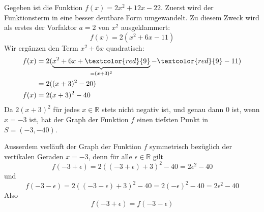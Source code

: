 \begin{examplebox}{}
    Gegeben ist die Funktion $f(x)=2x^2+12x-22$. Zuerst wird der Funktionsterm in eine \glqq besser deutbare\grqq{} Form umgewandelt. Zu diesem Zweck wird als erstes der Vorfaktor $a=2$ von $x^2$ ausgeklammert:
    \[
        f(x)=2(x^2+6x-11)
    \]
    Wir ergänzen den Term $x^2 + 6x$ quadratisch:
    \begin{align*}
        f(x) & = 2(\underbrace{x^2 +6x + \textcolor{red}{9}}_{=(x+3)^2} - \textcolor{red}{9} - 11) \\
             & = 2((x+3)^2-20)                                                                     \\
        f(x) & =2(x+3)^2-40
    \end{align*}
    Da $2(x+3)^2$ für jedes $x\in \mathbb{R}$ stets nicht negativ ist, und genau dann $0$ ist, wenn $x=-3$ ist, hat der Graph der Funktion $f$ einen tiefsten Punkt in $S=(-3,-40)$.

    Ausserdem verläuft der Graph der Funktion $f$ symmetrisch bezüglich der vertikalen Geraden $x=-3$, denn für alle $\epsilon \in \mathbb{R}$ gilt
    \[f(-3+\epsilon) = 2((-3+\epsilon)+3)^2-40=2\epsilon^2-40\]
    und
    \[f(-3-\epsilon) = 2((-3-\epsilon)+3)^2-40=2(-\epsilon)^2-40 = 2\epsilon^2 -40\]
    Also
    \[f(-3+\epsilon) = f(-3-\epsilon)\]

    \begin{center}
    \end{center}
\end{examplebox}
